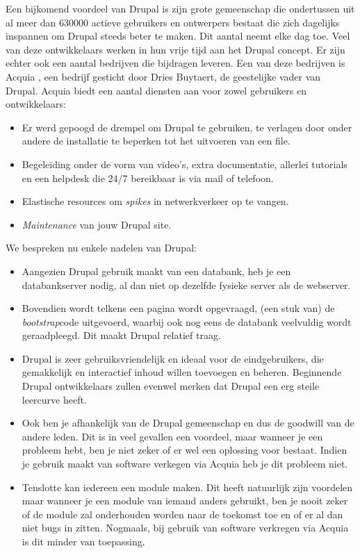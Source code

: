 \noindent
Een bijkomend voordeel van Drupal is zijn grote gemeenschap die ondertussen uit al meer dan 630000 actieve gebruikers en ontwerpers bestaat die zich dagelijks inspannen om Drupal steeds beter te maken. Dit aantal neemt elke dag toe. Veel van deze ontwikkelaars werken in hun vrije tijd aan het Drupal concept. Er zijn echter ook een aantal bedrijven die bijdragen leveren. Een van deze bedrijven is Acquia \cite{acquia}, een bedrijf gesticht door Dries Buytaert, de geestelijke vader van Drupal. Acquia biedt een aantal diensten aan voor zowel gebruikers en ontwikkelaars:
\begin{itemize}
\item Er werd gepoogd de drempel om Drupal te gebruiken, te verlagen door onder andere de installatie te beperken tot het uitvoeren van een file. \item Begeleiding onder de vorm van video's, extra documentatie, allerlei tutorials en een helpdesk die 24/7 bereikbaar is via mail of telefoon.
\item Elastische resources om \textit{spikes} in netwerkverkeer op te vangen.
\item \textit{Maintenance} van jouw Drupal site.
\end{itemize}

\noindent
We bespreken nu enkele nadelen van Drupal:
\begin{itemize}
\item Aangezien Drupal gebruik maakt van een databank, heb je een databankserver nodig, al dan niet op dezelfde fysieke server als de webserver.
\item Bovendien wordt telkens een pagina wordt opgevraagd, (een stuk van) de \textit{bootstrap}code uitgevoerd, waarbij ook nog eens de databank veelvuldig wordt geraadpleegd. 
Dit maakt Drupal relatief traag.
\item Drupal is zeer gebruiksvriendelijk en ideaal voor de eindgebruikers, die gemakkelijk en interactief inhoud willen toevoegen en beheren. 
Beginnende Drupal ontwikkelaars zullen evenwel merken dat Drupal een erg steile leercurve heeft.
\item Ook ben je afhankelijk van de Drupal gemeenschap en dus de goodwill van de andere leden. Dit is in veel gevallen een voordeel, maar wanneer je een probleem hebt, ben je niet zeker of er wel een oplossing voor bestaat. Indien je gebruik maakt van software verkegen via Acquia heb je dit probleem niet.
\item Tenslotte kan iedereen een module maken. Dit heeft natuurlijk zijn voordelen maar wanneer je een module van iemand anders gebruikt, ben je nooit zeker of de module zal onderhouden worden naar de toekomst toe en of er al dan niet bugs in zitten. Nogmaals, bij gebruik van software verkregen via Acquia is dit minder van toepassing.
\end{itemize}

